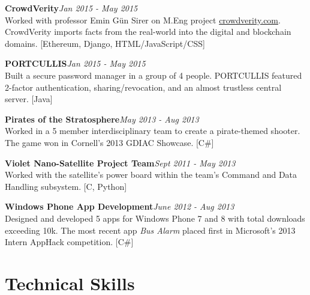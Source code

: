 \documentclass[11pt,letterpaper,sans]{moderncv}
\newenvironment{pzentry}[3]
{\textbf{#1}\notblank{#2}{\textit{~- #2}}{}\hfill\textit{#3}\\\normalsize}
{\bigskip}
\begin{document}
\begin{pzentry}{CrowdVerity}{}{Jan 2015 - May 2015}
Worked with professor Emin G\"{u}n Sirer on M.Eng project \url{crowdverity.com}.
CrowdVerity imports facts from the real-world into the digital and blockchain domains.
[Ethereum, Django, HTML/JavaScript/CSS]
\end{pzentry}

\begin{pzentry}{PORTCULLIS}{}{Jan 2015 - May 2015}
Built a secure password manager in a group of 4 people.
PORTCULLIS featured 2-factor authentication, sharing/revocation, and an almost trustless central server.
[Java]
\end{pzentry}

\begin{pzentry}{Pirates of the Stratosphere}{}{May 2013 - Aug 2013}Worked in a 5 member interdisciplinary team to create a pirate-themed shooter.
The game won in Cornell's 2013 GDIAC Showcase.
[C\#]
\end{pzentry}


\begin{pzentry}{Violet Nano-Satellite Project Team}{}{Sept 2011 - May 2013}
Worked with the satellite's power board within the team's Command and Data Handling subsystem. [C, Python]
\end{pzentry}

\begin{pzentry}{Windows Phone App Development}{}{June 2012 - Aug 2013}
Designed and developed 5 apps for Windows Phone 7 and 8 with total downloads exceeding 10k.  The most recent app \emph{Bus Alarm} placed first in Microsoft's 2013 Intern AppHack competition. [C\#]
\end{pzentry}




\section{Technical Skills} %

\medskip
{}
\end{document}
